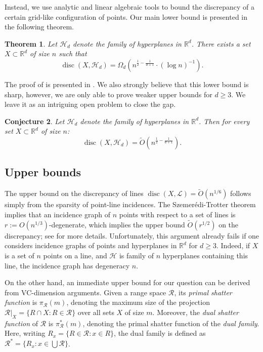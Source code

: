 \documentclass[11pt]{article}
\theoremstyle{plain}
\newtheorem{theorem}{Theorem}[section]
\newtheorem{conjecture}[theorem]{Conjecture}
\theoremstyle{definition}
\DeclareMathOperator{\disc}{disc}
\begin{document}
	Instead, we use analytic and linear algebraic tools to bound the discrepancy of a certain grid-like configuration of points. Our main lower bound is presented in the following theorem.
	
	\begin{theorem}\label{thm:main_lower}
		Let $\mathcal{H}_d$ denote the family of hyperplanes in $\mathbb{R}^d$. There exists a set $X\subset \mathbb{R}^d$ of size $n$ such that
		$$\disc(X,\mathcal{H}_d)=\Omega_d\left(n^{\frac{1}{2}-\frac{1}{d+1}}\cdot (\log n)^{-1}\right).$$
	\end{theorem}
	
	\noindent
	The proof of  is presented in . We also strongly believe that this lower bound is sharp, however, we are only able to prove weaker upper bounds for $d\geq 3$. We leave it as an intriguing open problem to close the gap.

    \begin{conjecture}
        Let $\mathcal{H}_d$ denote the family of hyperplanes in $\mathbb{R}^d$. Then for every set $X\subset \mathbb{R}^d$ of size $n$:
		$$\disc(X,\mathcal{H}_d)=\tilde{O}\left(n^{\frac{1}{2}-\frac{1}{d+1}}\right).$$
    \end{conjecture}
	
	\subsection{Upper bounds}
	
	The upper bound on the discrepancy of lines $\disc(X,\mathcal{L})=\tilde{O}(n^{1/6})$ follows simply from the sparsity of point-line incidences. The Szemer\'edi-Trotter theorem \cite{SzT} implies that an incidence graph of $n$ points with respect to a set of lines is $r:=O(n^{1/3})$-degenerate, which implies the upper bound $\tilde{O}(r^{1/2})$ on the discrepancy; see  for more details. Unfortunately, this argument already fails if one considers incidence graphs of points and hyperplanes in $\mathbb{R}^d$ for $d\geq 3$. Indeed, if $X$ is a set of $n$ points on a line, and $\mathcal{H}$ is family of $n$ hyperplanes containing this line, the incidence graph has degeneracy $n$.
	
	On the other hand, an immediate upper bound for our question can be derived from VC-dimension arguments. Given a range space $\mathcal{R}$, its \emph{primal shatter function} is $\pi_{\mathcal{R}}(m)$, denoting the maximum size of the projection $\mathcal{R}|_X=\{R\cap X:R\in\mathcal{R}\}$ over all sets $X$ of size $m$. Moreover, the \emph{dual shatter function} of $\mathcal{R}$ is $\pi^*_{\mathcal{R}}(m)$, denoting the primal shatter function of the \emph{dual family}. Here, writing $R_x=\{R\in \mathcal{R}:x\in R\}$, the dual family is defined as $\mathcal{R}^*=\{R_x:x\in \bigcup \mathcal{R}\}$.
	
\end{document}
